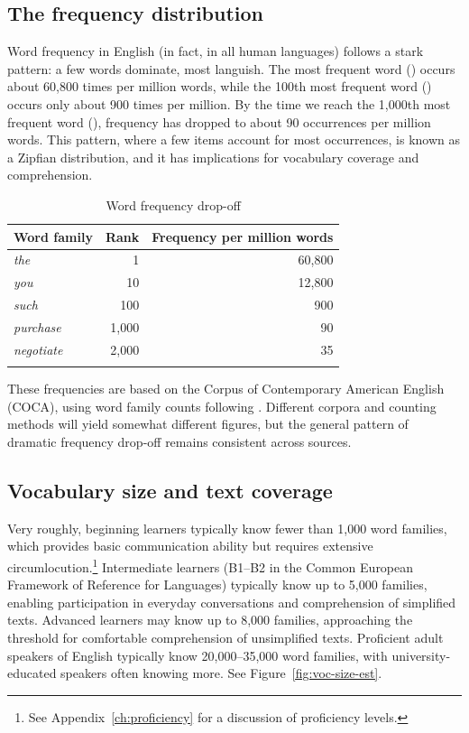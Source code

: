 \subsection{The frequency distribution}

Word frequency in English (in fact, in all human languages) follows a stark pattern: a few words dominate, most languish. The most frequent word () occurs about 60,800 times per million words, while the 100th most frequent word () occurs only about 900 times per million. By the time we reach the 1,000th most frequent word (), frequency has dropped to about 90 occurrences per million words. This pattern, where a few items account for most occurrences, is known as a Zipfian distribution, and it has implications for vocabulary coverage and comprehension.

\begin{table}
\caption{Word frequency drop-off}
\label{tab:word-frequency}
\begin{tabular}{lrr}
\lsptoprule
Word family & Rank & Frequency per million words \\
\midrule
\textit{the} & 1 & 60,800 \\
\textit{you} & 10 & 12,800 \\
\textit{such} & 100 & 900 \\
\textit{purchase} & 1,000 & 90 \\
\textit{negotiate} & 2,000 & 35 \\
\lspbottomrule
\end{tabular}
\end{table}
These frequencies are based on the Corpus of Contemporary American English (COCA), using word family counts following \citet{nation2022}. Different corpora and counting methods will yield somewhat different figures, but the general pattern of dramatic frequency drop-off remains consistent across sources.

\subsection{Vocabulary size and text coverage} \label{sec:vocab-size-coverage}

Very roughly, beginning learners typically know fewer than 1,000 word families, which provides basic communication ability but requires extensive circumlocution.\footnote{See Appendix~\ref{ch:proficiency} for a discussion of proficiency levels.} Intermediate learners (B1--B2 in the Common European Framework of Reference for Languages) typically know up to 5,000 families, enabling participation in everyday conversations and comprehension of simplified texts. Advanced learners may know up to 8,000 families, approaching the threshold for comfortable comprehension of unsimplified texts. Proficient adult speakers of English typically know 20,000--35,000 word families, with university-educated speakers often knowing more. See Figure~\ref{fig:voc-size-est}.

